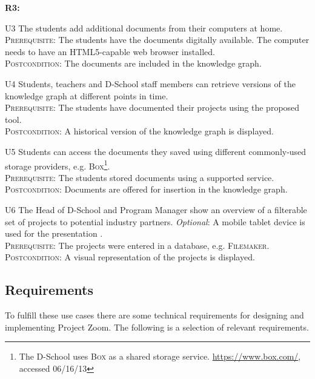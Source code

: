 \begin{labeling}{\textbf{R3:}}

\item[U3\label{uc:fromhome}] The students add additional documents from their computers at home.\\
\textsc{Prerequisite}: The students have the documents digitally available. The computer needs to have an HTML5-capable web browser installed.\\
\textsc{Postcondition}: The documents are included in the knowledge graph.


\item[U4\label{uc:versions}] Students, teachers and D-School staff members can retrieve versions of the knowledge graph at different points in time.\\
\textsc{Prerequisite}: The students have documented their projects using the proposed tool.\\
\textsc{Postcondition}: A historical version of the knowledge graph is displayed.

\item[U5\label{uc:storageproviders}] Students can access the documents they saved using different commonly-used storage pro\-vi\-ders, e.g. \textsc{Box}\footnote{The D-School uses \textsc{Box} as a shared storage service. \url{https://www.box.com/}, accessed 06/16/13}.\\
\textsc{Prerequisite}: The students stored documents using a supported service.\\
\textsc{Postcondition}: Documents are offered for insertion in the knowledge graph.

\item[U6\label{uc:multiplatform}] The Head of D-School and Program Manager show an overview of a filterable set of pro\-jects to potential industry partners. \textit{Optional}:  A mobile tablet device is used for the presentation .\\
\textsc{Prerequisite}: The projects were entered in a database, e.g. \textsc{Filemaker}.\\
\textsc{Postcondition}: A visual representation of the projects is displayed.
\end{labeling}

\subsection{Requirements}

To fulfill these use cases there are some technical requirements for designing and implementing Project Zoom. The following is a selection of relevant requirements.

